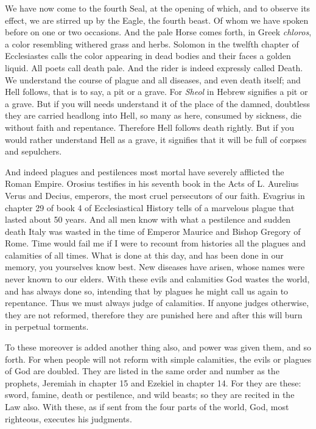 We have now come to the fourth Seal, at the opening of which, and to observe its effect, we are stirred up by the Eagle, the fourth beast. Of whom we have spoken before on one or two occasions. And the pale Horse comes forth, in Greek \textit{chloros}, a color resembling withered grass and herbs. Solomon in the twelfth chapter of Ecclesiastes calls the color appearing in dead bodies and their faces a golden liquid. All poets call death pale. And the rider is indeed expressly called Death. We understand the course of plague and all diseases, and even death itself; and Hell follows, that is to say, a pit or a grave. For \textit{Sheol} in Hebrew signifies a pit or a grave. But if you will needs understand it of the place of the damned, doubtless they are carried headlong into Hell, so many as here, consumed by sickness, die without faith and repentance. Therefore Hell follows death rightly. But if you would rather understand Hell as a grave, it signifies that it will be full of corpses and sepulchers.

And indeed plagues and pestilences most mortal have severely afflicted the Roman Empire. Orosius testifies in his seventh book in the Acts of L. Aurelius Verus and Decius, emperors, the most cruel persecutors of our faith. Evagrius in chapter 29 of book 4 of Ecclesiastical History tells of a marvelous plague that lasted about 50 years. And all men know with what a pestilence and sudden death Italy was wasted in the time of Emperor Maurice and Bishop Gregory of Rome. Time would fail me if I were to recount from histories all the plagues and calamities of all times. What is done at this day, and has been done in our memory, you yourselves know best. New diseases have arisen, whose names were never known to our elders. With these evils and calamities God wastes the world, and has always done so, intending that by plagues he might call us again to repentance. Thus we must always judge of calamities. If anyone judges otherwise, they are not reformed, therefore they are punished here and after this will burn in perpetual torments.

To these moreover is added another thing also, and power was given them, and so forth. For when people will not reform with simple calamities, the evils or plagues of God are doubled. They are listed in the same order and number as the prophets, Jeremiah in chapter 15 and Ezekiel in chapter 14. For they are these: sword, famine, death or pestilence, and wild beasts; so they are recited in the Law also. With these, as if sent from the four parts of the world, God, most righteous, executes his judgments.

